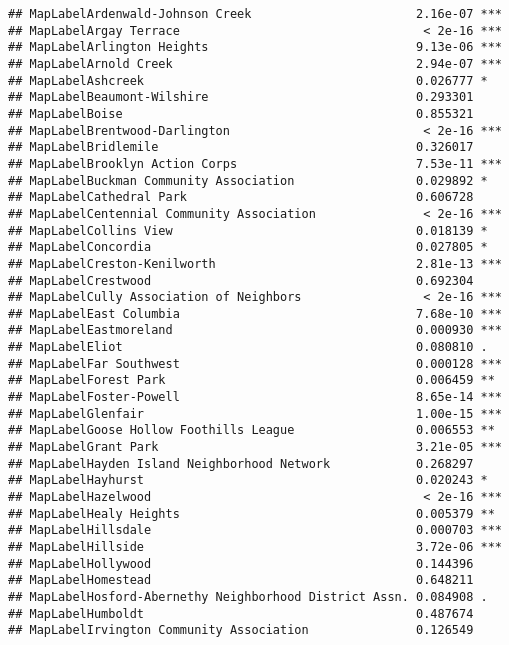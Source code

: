 \documentclass[]{article}
\begin{document}
\begin{verbatim}
## MapLabelArdenwald-Johnson Creek                       2.16e-07 ***
## MapLabelArgay Terrace                                  < 2e-16 ***
## MapLabelArlington Heights                             9.13e-06 ***
## MapLabelArnold Creek                                  2.94e-07 ***
## MapLabelAshcreek                                      0.026777 *  
## MapLabelBeaumont-Wilshire                             0.293301    
## MapLabelBoise                                         0.855321    
## MapLabelBrentwood-Darlington                           < 2e-16 ***
## MapLabelBridlemile                                    0.326017    
## MapLabelBrooklyn Action Corps                         7.53e-11 ***
## MapLabelBuckman Community Association                 0.029892 *  
## MapLabelCathedral Park                                0.606728    
## MapLabelCentennial Community Association               < 2e-16 ***
## MapLabelCollins View                                  0.018139 *  
## MapLabelConcordia                                     0.027805 *  
## MapLabelCreston-Kenilworth                            2.81e-13 ***
## MapLabelCrestwood                                     0.692304    
## MapLabelCully Association of Neighbors                 < 2e-16 ***
## MapLabelEast Columbia                                 7.68e-10 ***
## MapLabelEastmoreland                                  0.000930 ***
## MapLabelEliot                                         0.080810 .  
## MapLabelFar Southwest                                 0.000128 ***
## MapLabelForest Park                                   0.006459 ** 
## MapLabelFoster-Powell                                 8.65e-14 ***
## MapLabelGlenfair                                      1.00e-15 ***
## MapLabelGoose Hollow Foothills League                 0.006553 ** 
## MapLabelGrant Park                                    3.21e-05 ***
## MapLabelHayden Island Neighborhood Network            0.268297    
## MapLabelHayhurst                                      0.020243 *  
## MapLabelHazelwood                                      < 2e-16 ***
## MapLabelHealy Heights                                 0.005379 ** 
## MapLabelHillsdale                                     0.000703 ***
## MapLabelHillside                                      3.72e-06 ***
## MapLabelHollywood                                     0.144396    
## MapLabelHomestead                                     0.648211    
## MapLabelHosford-Abernethy Neighborhood District Assn. 0.084908 .  
## MapLabelHumboldt                                      0.487674    
## MapLabelIrvington Community Association               0.126549    

\end{verbatim}
\end{document}
